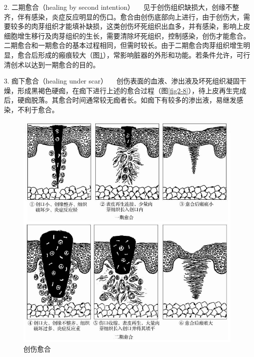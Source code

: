 {2. 二期愈合（healing by second intention）}
　见于创伤组织缺损大，创缘不整齐，伴有感染，炎症反应明显的伤口。愈合由创伤底部向上进行，由于创伤大，需要较多的肉芽组织才能填补缺损，这类创伤坏死组织出血多，并有感染，影响上皮细胞增生移行及肉芽组织的生长，需要清除坏死组织，控制感染，创伤才能愈合。二期愈合和一期愈合的基本过程相同，但需时较长。由于二期愈合肉芽组织增生明显，愈合后形成的瘢痕较大（图\ref{fig2-7}），常影响脏器的外形和功能。若条件允许，可行清创术以达到一期愈合的目的。

{3. 痂下愈合（healing under scar）}
　创伤表面的血液、渗出液及坏死组织凝固干燥，形成黑褐色硬痂，在痂下进行上述的愈合过程（图\ref{fig2-8}），待上皮再生完成后，硬痂脱落。其愈合时间通常较无痂者长。如痂下有较多的渗出液，易继发感染，不利于愈合。
\begin{figure}[!htbp]
	\centering
    \includegraphics{./images/Image00030.jpg}
	\caption{创伤愈合}
	\label{fig2-7} 
	\end{figure} 


